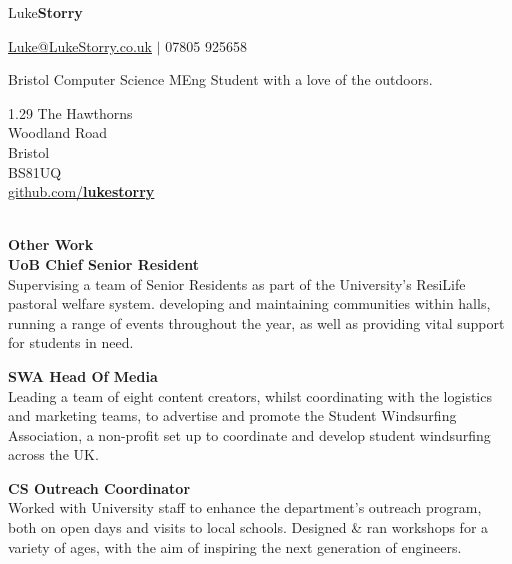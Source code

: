 \documentclass[10pt]{article}
\newcommand{\bold}[1]{\textbf{\textcolor{dark}{#1}}}
\newcommand{\sect}[1]{{\LARGE\bold{#1}}\vspace{0.2em}\\}
\newcommand{\xx}[2]{{\large\bold{#1}}\\{#2}\vspace{0.5em}}
\begin{document}
\begin{center}
{\color{dark}\Huge Luke\textbf{Storry}}
\hspace{0.1em}

{\large \href{mailto:Luke@LukeStorry.co.uk}{Luke@LukeStorry.co.uk}  $|$  07805 925658} 

Bristol Computer Science MEng Student with a love of the outdoors.\\
\vspace{-0.5em}
{\color{dark}\hrulefill}
\end{center}
%
%
%
%
%
%
\begin{minipage}[t]{0.33\textwidth} %
1.29  The Hawthorns\\Woodland Road\\Bristol\\BS81UQ
\vspace{0.5em}\\
\href{https://github.com/lukestorry}{github.com/\bold{\textcolor{dark}{lukestorry}}} \\
\\
\raggedright
\sect{Other Work}
\xx{UoB Chief Senior Resident}
{Supervising a team of Senior Residents as part of the University's ResiLife pastoral welfare system. developing and maintaining communities within halls, running a range of events throughout the year, as well as providing vital support for students in need.
}

\xx{SWA Head Of Media}
{Leading a team of eight content creators, whilst coordinating with the logistics and marketing teams, to advertise and promote the Student Windsurfing Association, a non-profit set up to coordinate and develop student windsurfing across the UK.
}

\xx{CS Outreach Coordinator}
{Worked with University staff to enhance the department's outreach program, both on open days and visits to local schools. 
Designed \& ran workshops for a variety of ages, with the aim of inspiring the next generation of engineers.}


\end{minipage}
\end{document}
